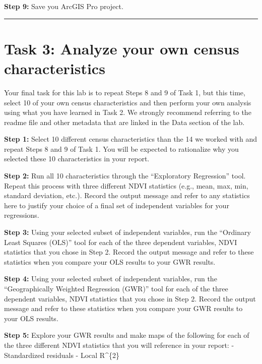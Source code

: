 \documentclass[
]{book}
\begin{document}
\textbf{Step 9:} Save you ArcGIS Pro project.

\begin{center}\rule{0.5\linewidth}{0.5pt}\end{center}

\hypertarget{task-3-analyze-your-own-census-characteristics}{%
\section*{Task 3: Analyze your own census characteristics}\label{task-3-analyze-your-own-census-characteristics}}

Your final task for this lab is to repeat Steps 8 and 9 of Task 1, but this time, select 10 of your own census characteristics and then perform your own analysis using what you have learned in Task 2. We strongly recommend referring to the readme file and other metadata that are linked in the Data section of the lab.

\textbf{Step 1:} Select 10 different census characteristics than the 14 we worked with and repeat Steps 8 and 9 of Task 1. You will be expected to rationalize why you selected these 10 characteristics in your report.

\textbf{Step 2:} Run all 10 characteristics through the ``Exploratory Regression'' tool. Repeat this process with three different NDVI statistics (e.g., mean, max, min, standard deviation, etc.). Record the output message and refer to any statistics here to justify your choice of a final set of independent variables for your regressions.

\textbf{Step 3:} Using your selected subset of independent variables, run the ``Ordinary Least Squares (OLS)'' tool for each of the three dependent variables, NDVI statistics that you chose in Step 2. Record the output message and refer to these statistics when you compare your OLS results to your GWR results.

\textbf{Step 4:} Using your selected subset of independent variables, run the ``Geographically Weighted Regression (GWR)'' tool for each of the three dependent variables, NDVI statistics that you chose in Step 2. Record the output message and refer to these statistics when you compare your GWR results to your OLS results.

\textbf{Step 5:} Explore your GWR results and make maps of the following for each of the three different NDVI statistics that you will reference in your report:
- Standardized residuals
- Local R\^{}\{2\}
\end{document}
